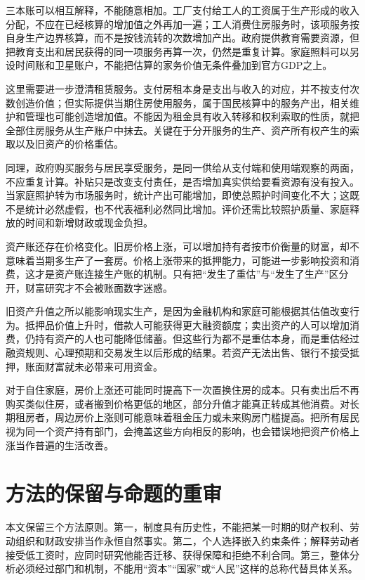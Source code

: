 \documentclass[UTF8,fontset=fandol,zihao=-4,oneside,openany]{ctexbook}
\begin{document}
三本账可以相互解释，不能随意相加。工厂支付给工人的工资属于生产形成的收入分配，不应在已经核算的增加值之外再加一遍；工人消费住房服务时，该项服务按自身生产边界核算，而不是按钱流转的次数增加产出。政府提供教育需要资源，但把教育支出和居民获得的同一项服务再算一次，仍然是重复计算。家庭照料可以另设时间账和卫星账户，不能把估算的家务价值无条件叠加到官方GDP之上。

\label{arg:P010}
这里需要进一步澄清租赁服务。支付房租本身是支出与收入的对应，并不按支付次数创造价值；但实际提供当期住房使用服务，属于国民核算中的服务产出，相关维护和管理也可能创造增加值。不能因为租金具有收入转移和权利索取的性质，就把全部住房服务从生产账户中抹去。关键在于分开服务的生产、资产所有权产生的索取以及旧资产的价格重估。

同理，政府购买服务与居民享受服务，是同一供给从支付端和使用端观察的两面，不应重复计算。补贴只是改变支付责任，是否增加真实供给要看资源有没有投入。当家庭照护转为市场服务时，统计产出可能增加，即使总照护时间变化不大；这既不是统计必然虚假，也不代表福利必然同比增加。评价还需比较照护质量、家庭释放的时间和新增财政或现金负担。

资产账还存在价格变化。旧房价格上涨，可以增加持有者按市价衡量的财富，却不意味着当期多生产了一套房。价格上涨带来的抵押能力，可能进一步影响投资和消费，这才是资产账连接生产账的机制。只有把“发生了重估”与“发生了生产”区分开，财富研究才不会被账面数字迷惑。

\label{arg:P011}
旧资产升值之所以能影响现实生产，是因为金融机构和家庭可能根据其估值改变行为。抵押品价值上升时，借款人可能获得更大融资额度；卖出资产的人可以增加消费，仍持有资产的人也可能降低储蓄。但这些行为都不是重估本身，而是重估经过融资规则、心理预期和交易发生以后形成的结果。若资产无法出售、银行不接受抵押，账面财富就未必带来可用资金。

对于自住家庭，房价上涨还可能同时提高下一次置换住房的成本。只有卖出后不再购买类似住房，或者搬到价格更低的地区，部分升值才能真正转成其他消费。对长期租房者，周边房价上涨则可能意味着租金压力或未来购房门槛提高。把所有居民视为同一个资产持有部门，会掩盖这些方向相反的影响，也会错误地把资产价格上涨当作普遍的生活改善。

\section{方法的保留与命题的重审}
本文保留三个方法原则。第一，制度具有历史性，不能把某一时期的财产权利、劳动组织和财政安排当作永恒自然事实。第二，个人选择嵌入约束条件；解释劳动者接受低工资时，应同时研究他能否迁移、获得保障和拒绝不利合同。第三，整体分析必须经过部门和机制，不能用“资本”“国家”或“人民”这样的总称代替具体关系。
\end{document}
